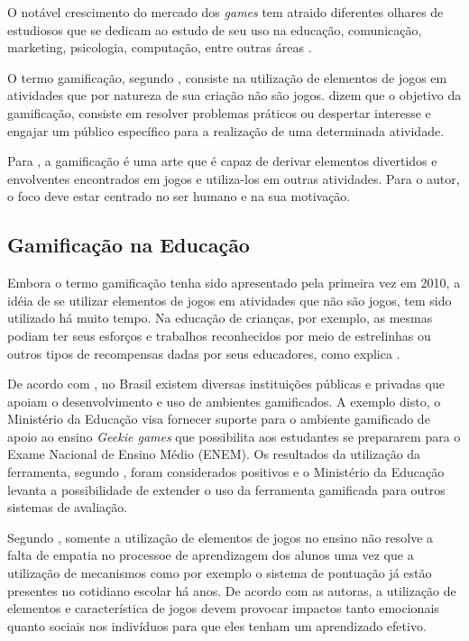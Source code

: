 O notável crescimento do mercado dos \textit{games} tem atraido diferentes olhares de estudiosos que se dedicam ao estudo de seu
uso na educação, comunicação, marketing, psicologia, computação, entre outras áreas \cite{da2014gamificaccao}.

O termo gamificação, segundo , consiste na utilização de elementos de jogos em 
atividades que por natureza de sua criação não são jogos.  dizem que o objetivo da gamificação, consiste em resolver
problemas práticos ou despertar interesse e engajar um público específico para a realização de uma determinada
atividade. 

Para , a gamificação é uma arte que é capaz de derivar elementos divertidos e envolventes encontrados em jogos e utiliza-los
em outras atividades. Para o autor, o foco deve estar centrado no ser humano e na sua motivação.

\subsection{Gamificação na Educação}
Embora o termo gamificação tenha sido apresentado pela primeira vez em 2010, a idéia de se utilizar
elementos de jogos em atividades que não são jogos, tem sido utilizado há muito tempo. Na educação
de crianças, por exemplo, as mesmas podiam ter seus esforços e trabalhos reconhecidos por meio
de estrelinhas ou outros tipos de recompensas dadas por seus educadores, como explica .

De acordo com , no Brasil existem diversas instituições públicas e privadas que apoiam o desenvolvimento e uso de ambientes
gamificados. A exemplo disto, o Ministério da Educação visa fornecer suporte para o ambiente gamificado de apoio ao ensino \textit{Geekie games} que possibilita
aos estudantes se prepararem para o Exame Nacional de Ensino Médio (ENEM). Os resultados da utilização da ferramenta, segundo , 
foram considerados positivos e o Ministério da Educação levanta a possibilidade de extender o uso da ferramenta gamificada para outros sistemas de avaliação.

Segundo , somente a utilização de elementos de jogos no ensino não resolve a falta de empatia no processoe de aprendizagem dos alunos
uma vez que a utilização de mecanismos como por exemplo o sistema de pontuação já estão presentes no cotidiano escolar há anos. De acordo com as autoras, 
a utilização de elementos e característica de jogos devem provocar impactos tanto emocionais quanto sociais nos indivíduos para que eles tenham um aprendizado
efetivo. 

